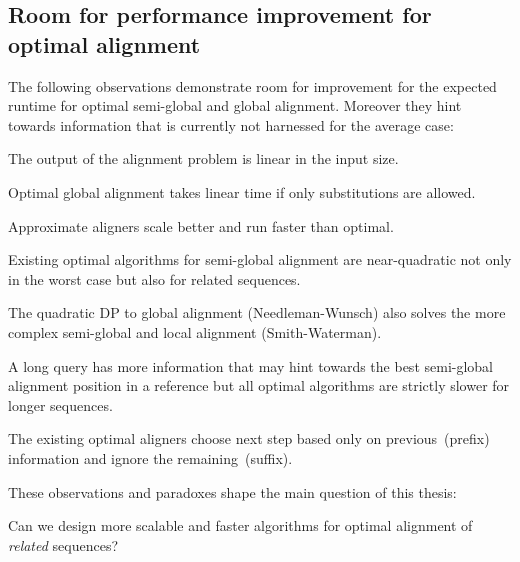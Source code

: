 \subsection*{Room for performance improvement for optimal alignment}

The following observations demonstrate room for improvement for the expected
runtime for optimal semi-global and global alignment. Moreover they hint towards
information that is currently not harnessed for the average case:

\begin{observation}
    The output of the alignment problem is linear in the input size.
\end{observation}

\begin{observation}
    Optimal global alignment takes linear time if only substitutions are allowed.
\end{observation}

\begin{observation}
    Approximate aligners scale better and run faster than optimal.
\end{observation}

\begin{observation}
    Existing optimal algorithms for semi-global alignment are near-quadratic not
    only in the worst case but also for related sequences.
\end{observation}

\begin{observation}
    The quadratic DP to global alignment (Needleman-Wunsch) also solves the more
    complex semi-global and local alignment (Smith-Waterman).
\end{observation}

\begin{paradox}
    A long query has more information that may hint towards the best semi-global
    alignment position in a reference but all optimal algorithms are strictly
    slower for longer sequences.
\end{paradox}

\begin{observation}
    The existing optimal aligners choose next step based only on
    previous~(prefix) information and ignore the remaining~(suffix).
\end{observation}

These observations and paradoxes shape the main question of this thesis:

\begin{problem}
    Can we design more scalable and faster algorithms for optimal alignment of
    \emph{related} sequences?
\end{problem}

